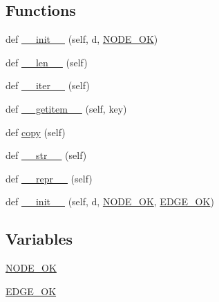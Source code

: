 \subsection*{Functions}
\begin{DoxyCompactItemize}
\item 
def \hyperlink{namespacenetworkx_1_1classes_1_1coreviews_ad036d09430f59529444c6b08517d58af}{\+\_\+\+\_\+init\+\_\+\+\_\+} (self, d, \hyperlink{namespacenetworkx_1_1classes_1_1coreviews_a31651afc2ddeac810dfbd2b216770438}{N\+O\+D\+E\+\_\+\+OK})
\item 
def \hyperlink{namespacenetworkx_1_1classes_1_1coreviews_afad6c475285f347306f2c876e2a380e2}{\+\_\+\+\_\+len\+\_\+\+\_\+} (self)
\item 
def \hyperlink{namespacenetworkx_1_1classes_1_1coreviews_acc7d5c8ed79c9588bc44aaefdaf9db89}{\+\_\+\+\_\+iter\+\_\+\+\_\+} (self)
\item 
def \hyperlink{namespacenetworkx_1_1classes_1_1coreviews_adc3ec68b23f9d2c95460985778bbbc3c}{\+\_\+\+\_\+getitem\+\_\+\+\_\+} (self, key)
\item 
def \hyperlink{namespacenetworkx_1_1classes_1_1coreviews_a3358e04954e961b1afc8b5f90726dcca}{copy} (self)
\item 
def \hyperlink{namespacenetworkx_1_1classes_1_1coreviews_acc2f1459ff2d78042ed9cbb3deaaa748}{\+\_\+\+\_\+str\+\_\+\+\_\+} (self)
\item 
def \hyperlink{namespacenetworkx_1_1classes_1_1coreviews_afd9193bd8982a6ebddb3afa25c89d0e4}{\+\_\+\+\_\+repr\+\_\+\+\_\+} (self)
\item 
def \hyperlink{namespacenetworkx_1_1classes_1_1coreviews_a0dace68790726c8d24e2af6e444e9ad9}{\+\_\+\+\_\+init\+\_\+\+\_\+} (self, d, \hyperlink{namespacenetworkx_1_1classes_1_1coreviews_a31651afc2ddeac810dfbd2b216770438}{N\+O\+D\+E\+\_\+\+OK}, \hyperlink{namespacenetworkx_1_1classes_1_1coreviews_adda2aa7bb1be12eb153b6e7622bc4028}{E\+D\+G\+E\+\_\+\+OK})
\end{DoxyCompactItemize}
\subsection*{Variables}
\begin{DoxyCompactItemize}
\item 
\hyperlink{namespacenetworkx_1_1classes_1_1coreviews_a31651afc2ddeac810dfbd2b216770438}{N\+O\+D\+E\+\_\+\+OK}
\item 
\hyperlink{namespacenetworkx_1_1classes_1_1coreviews_adda2aa7bb1be12eb153b6e7622bc4028}{E\+D\+G\+E\+\_\+\+OK}
\end{DoxyCompactItemize}


